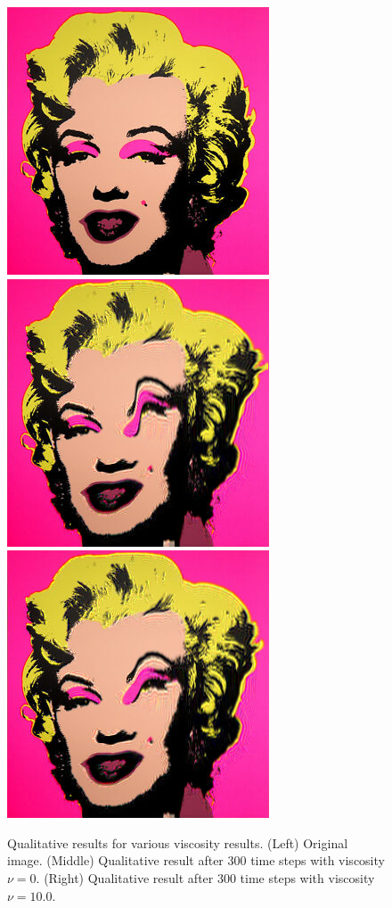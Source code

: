 \documentclass[sigconf]{acmart}
\begin{document}
\begin{figure}
    \centering
    \includegraphics[width=0.32\linewidth]{figs/monroe.jpeg}
    \includegraphics[width=0.32\linewidth]{figs/monroe_vis0.png}
    \includegraphics[width=0.32\linewidth]{figs/monroe_vis10.png}
    \caption{Qualitative results for various viscosity results. (Left) Original image. (Middle) Qualitative result after 300 time steps with viscosity $\nu = 0$. (Right) Qualitative result after 300 time steps with viscosity $\nu = 10.0$.
    \label{fig:monroe-vis}}
\end{figure}
\end{document}
